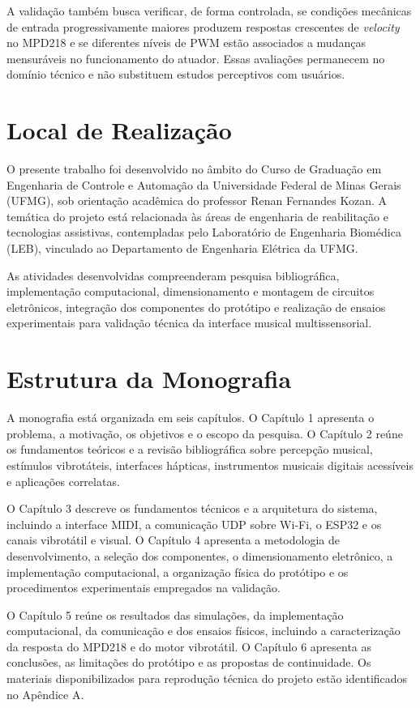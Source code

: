 A validação também busca verificar, de forma controlada, se condições mecânicas de entrada progressivamente maiores produzem respostas crescentes de \textit{velocity} no MPD218 e se diferentes níveis de PWM estão associados a mudanças mensuráveis no funcionamento do atuador. Essas avaliações permanecem no domínio técnico e não substituem estudos perceptivos com usuários.

\section{Local de Realização}

O presente trabalho foi desenvolvido no âmbito do Curso de Graduação em Engenharia de Controle e Automação da Universidade Federal de Minas Gerais (UFMG), sob orientação acadêmica do professor Renan Fernandes Kozan. A temática do projeto está relacionada às áreas de engenharia de reabilitação e tecnologias assistivas, contempladas pelo Laboratório de Engenharia Biomédica (LEB), vinculado ao Departamento de Engenharia Elétrica da UFMG.

As atividades desenvolvidas compreenderam pesquisa bibliográfica, implementação computacional, dimensionamento e montagem de circuitos eletrônicos, integração dos componentes do protótipo e realização de ensaios experimentais para validação técnica da interface musical multissensorial.

\section{Estrutura da Monografia}

A monografia está organizada em seis capítulos. O Capítulo 1 apresenta o problema, a motivação, os objetivos e o escopo da pesquisa. O Capítulo 2 reúne os fundamentos teóricos e a revisão bibliográfica sobre percepção musical, estímulos vibrotáteis, interfaces hápticas, instrumentos musicais digitais acessíveis e aplicações correlatas.

O Capítulo 3 descreve os fundamentos técnicos e a arquitetura do sistema, incluindo a interface MIDI, a comunicação UDP sobre Wi-Fi, o ESP32 e os canais vibrotátil e visual. O Capítulo 4 apresenta a metodologia de desenvolvimento, a seleção dos componentes, o dimensionamento eletrônico, a implementação computacional, a organização física do protótipo e os procedimentos experimentais empregados na validação.

O Capítulo 5 reúne os resultados das simulações, da implementação computacional, da comunicação e dos ensaios físicos, incluindo a caracterização da resposta do MPD218 e do motor vibrotátil. O Capítulo 6 apresenta as conclusões, as limitações do protótipo e as propostas de continuidade. Os materiais disponibilizados para reprodução técnica do projeto estão identificados no Apêndice A.

